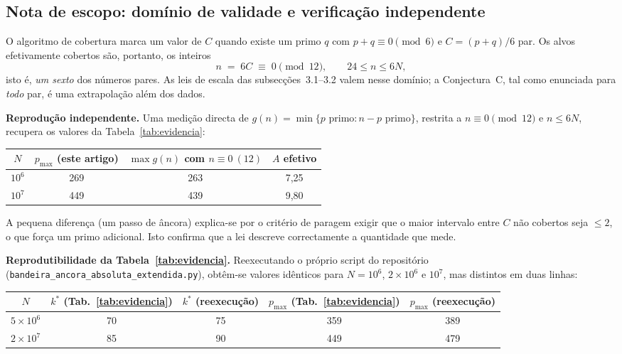 \documentclass[11pt]{article}
\begin{document}
	\subsection{Nota de escopo: domínio de validade e verificação independente}
	\label{sec:escopo}
	
	O algoritmo de cobertura marca um valor de $C$ quando existe um primo $q$ com
	$p+q\equiv 0\pmod 6$ e $C=(p+q)/6$ par. Os alvos efetivamente cobertos são,
	portanto, os inteiros
	\[
		n \;=\; 6C \;\equiv\; 0 \pmod{12}, \qquad 24 \le n \le 6N,
	\]
	isto é, \emph{um sexto} dos números pares. As leis de escala das
	subsecções~3.1--3.2 valem nesse domínio; a Conjectura~C, tal como enunciada
	para \emph{todo} par, é uma extrapolação além dos dados.
	
	\textbf{Reprodução independente.} Uma medição directa de
	$g(n)=\min\{p \text{ primo}: n-p \text{ primo}\}$, restrita a $n\equiv0\pmod{12}$
	e $n\le 6N$, recupera os valores da Tabela~\ref{tab:evidencia}:
	
	\begin{center}
		\begin{tabular}{cccc}
			\toprule
			$N$ & $p_{\max}$ (este artigo) & $\max g(n)$ com $n\equiv0\ (12)$ & $A$ efetivo \\
			\midrule
			$10^6$ & 269 & 263 & 7,25 \\
			$10^7$ & 449 & 439 & 9,80 \\
			\bottomrule
		\end{tabular}
	\end{center}
	
	A pequena diferença (um passo de âncora) explica-se por o critério de paragem
	exigir que o maior intervalo entre $C$ não cobertos seja $\le2$, o que força
	um primo adicional. Isto confirma que a lei descreve correctamente a
	quantidade que mede.
	
	\textbf{Reprodutibilidade da Tabela~\ref{tab:evidencia}.} Reexecutando o
	próprio script do repositório (\texttt{bandeira\_ancora\_absoluta\_extendida.py}),
	obtêm-se valores idênticos para $N=10^6$, $2\times10^6$ e $10^7$, mas
	distintos em duas linhas:
	
	\begin{center}
		\begin{tabular}{ccccc}
			\toprule
			$N$ & $k^*$ (Tab.~\ref{tab:evidencia}) & $k^*$ (reexecução) & $p_{\max}$ (Tab.~\ref{tab:evidencia}) & $p_{\max}$ (reexecução) \\
			\midrule
			$5\times10^6$ & 70 & 75 & 359 & 389 \\
			$2\times10^7$ & 85 & 90 & 449 & 479 \\
			\bottomrule
		\end{tabular}
	\end{center}
	
\end{document}
